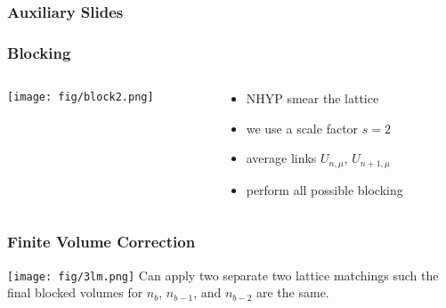 
\begin{frame}
  \addtocounter{framenumber}{-1}
  \frametitle{Auxiliary Slides}
\end{frame}

\begin{frame}
  \addtocounter{framenumber}{-1}
  \frametitle{Blocking}
  \begin{columns}[T]
    \begin{column}{.5\textwidth}
      \begin{block}{}
        \texttt{[image: fig/block2.png]}
      \end{block}
    \end{column}
    \begin{column}{.5\textwidth}
      \begin{block}{}
        \begin{itemize}
          \item NHYP smear the lattice
          \item we use a scale factor $s=2$
          \item average links $U_{n,\mu}$, $U_{n+1,\mu}$
          \item perform all possible blocking
        \end{itemize}
      \end{block}
    \end{column}
  \end{columns}
\end{frame}

\begin{frame}
  \addtocounter{framenumber}{-1}
  \frametitle{Finite Volume Correction}
  \centering
  \texttt{[image: fig/3lm.png]}
  \vspace{12pt}
  Can apply two separate two lattice matchings such the final blocked volumes for $n_b$, $n_{b-1}$, and $n_{b-2}$ are the same.
\end{frame}

